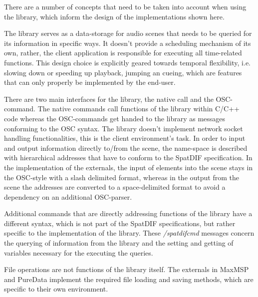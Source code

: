 \documentclass{article}
\begin{document}
There are a number of concepts that need to be taken into account when using the library, which inform the design of the implementations shown here.

The library serves as a data-storage for audio scenes that needs to be queried for its information in specific ways.
It doesn't provide a scheduling mechanism of its own, rather, the client application is responsible for executing all time-related functions.
This design choice is explicitly geared towards temporal flexibility, i.e. slowing down or speeding up playback, jumping an cueing, which are features that can only properly be implemented by the end-user.

There are two main interfaces for the library, the native call and the OSC-command.
The native commands call functions of the library within C/C++ code whereas the OSC-commands get handed to the library as messages conforming to the OSC syntax.
The library doesn't implement network socket handling functionalities, this is the client environment's task.
In order to input and output information directly to/from the scene, the name-space is described with hierarchical addresses that have to conform to the SpatDIF specification.
In the implementation of the externals, the input of elements into the scene stays in the OSC-style with a slash delimited format, whereas in the output from the scene the addresses are converted to a space-delimited format to avoid a dependency on an additional OSC-parser.

Additional commands that are directly addressing functions of the library have a different syntax, which is not part of the SpatDIF specifications, but rather specific to the implementation of the library.
These \emph{/spatdifcmd} messages concern the querying of information from the library and the setting and getting of variables necessary for the executing the queries.

File operations are not functions of the library itself.
The externals in MaxMSP and PureData implement the required file loading and saving methods, which are specific to their own environment. 
 
\end{document}
